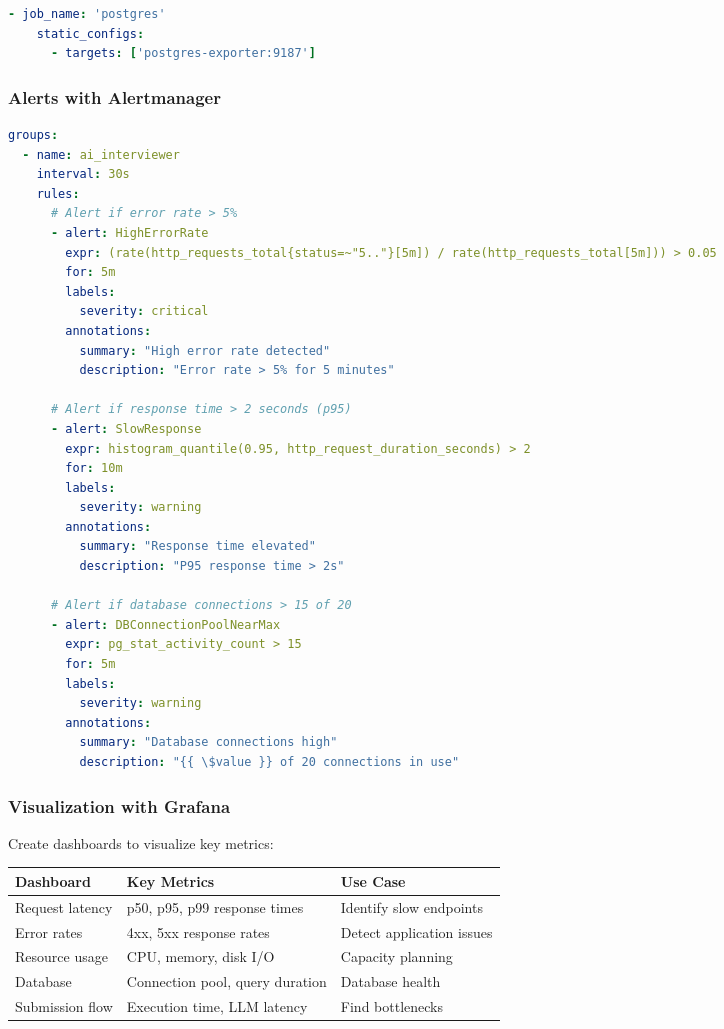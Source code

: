 \documentclass[12pt,a4paper,oneside]{article}
\begin{document}
{{\begin{lstlisting}[language=YAML, caption=prometheus.yml]
  - job_name: 'postgres'
    static_configs:
      - targets: ['postgres-exporter:9187']
\end{lstlisting}

\subsubsection{Alerts with Alertmanager}

\begin{lstlisting}[language=YAML, caption=alerting.rules.yml]
groups:
  - name: ai_interviewer
    interval: 30s
    rules:
      # Alert if error rate > 5%
      - alert: HighErrorRate
        expr: (rate(http_requests_total{status=~"5.."}[5m]) / rate(http_requests_total[5m])) > 0.05
        for: 5m
        labels:
          severity: critical
        annotations:
          summary: "High error rate detected"
          description: "Error rate > 5% for 5 minutes"
      
      # Alert if response time > 2 seconds (p95)
      - alert: SlowResponse
        expr: histogram_quantile(0.95, http_request_duration_seconds) > 2
        for: 10m
        labels:
          severity: warning
        annotations:
          summary: "Response time elevated"
          description: "P95 response time > 2s"
      
      # Alert if database connections > 15 of 20
      - alert: DBConnectionPoolNearMax
        expr: pg_stat_activity_count > 15
        for: 5m
        labels:
          severity: warning
        annotations:
          summary: "Database connections high"
          description: "{{ \$value }} of 20 connections in use"
\end{lstlisting}

\subsubsection{Visualization with Grafana}

Create dashboards to visualize key metrics:

\begin{table}[H]
\centering
\begin{tabular}{|p{3cm}|p{3cm}|p{6cm}|}
\hline
\textbf{Dashboard} & \textbf{Key Metrics} & \textbf{Use Case} \\
\hline
Request latency & p50, p95, p99 response times & Identify slow endpoints \\
\hline
Error rates & 4xx, 5xx response rates & Detect application issues \\
\hline
Resource usage & CPU, memory, disk I/O & Capacity planning \\
\hline
Database & Connection pool, query duration & Database health \\
\hline
Submission flow & Execution time, LLM latency & Find bottlenecks \\
\hline
\end{tabular}
\end{table}

}}
\end{document}
